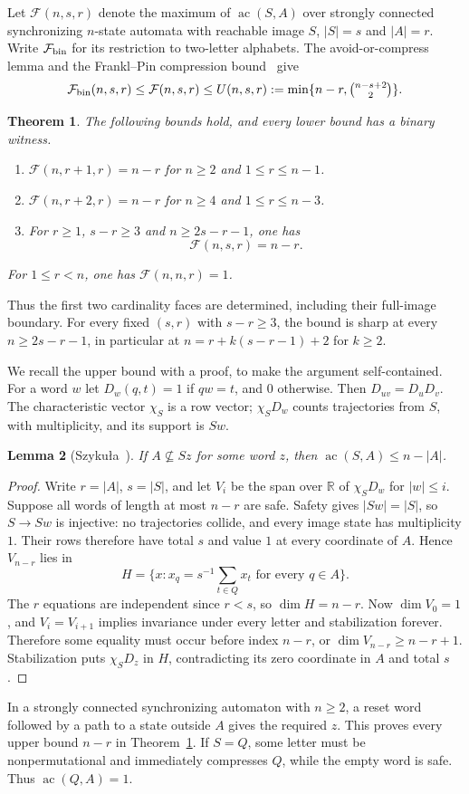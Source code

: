 \documentclass[10pt]{article}
\newtheorem{theorem}{Theorem}
\newtheorem{lemma}[theorem]{Lemma}
\newcommand{\ac}{\operatorname{ac}}
\newcommand{\Max}{\mathcal F}
\begin{document}
Let $\Max(n,s,r)$ denote the maximum of $\ac(S,A)$ over strongly connected synchronizing $n$-state automata with reachable image $S$, $|S|=s$ and $|A|=r$.
Write $\Max_{\rm bin}$ for its restriction to two-letter alphabets. The avoid-or-compress lemma and the Frankl--Pin compression bound~\cite[Theorem~1]{szykula2018} give
\[
 \Max_{\rm bin}(n,s,r)\le\Max(n,s,r)\le
 U(n,s,r):=\min\{n-r,\tbinom{n-s+2}{2}\}.
\]
\begin{theorem}\label{thm:main}
The following bounds hold, and every lower bound has a binary witness.
\begin{enumerate}
\item $\Max(n,r+1,r)=n-r$ for $n\ge2$ and $1\le r\le n-1$.
\item $\Max(n,r+2,r)=n-r$ for $n\ge4$ and $1\le r\le n-3$.
\item For $r\ge1$, $s-r\ge3$ and $n\ge2s-r-1$, one has
\[
 \Max(n,s,r)=n-r.
\]
\end{enumerate}
For $1\le r<n$, one has $\Max(n,n,r)=1$.
\end{theorem}
Thus the first two cardinality faces are determined, including their full-image boundary. For every fixed $(s,r)$ with $s-r\ge3$, the bound is sharp at every $n\ge2s-r-1$, in particular at $n=r+k(s-r-1)+2$ for $k\ge2$.

We recall the upper bound with a proof, to make the argument self-contained. For a word $w$ let $D_w(q,t)=1$ if $qw=t$, and $0$ otherwise. Then $D_{uv}=D_uD_v$. The characteristic vector $\chi_S$ is a row vector; $\chi_SD_w$ counts trajectories from $S$, with multiplicity, and its support is $Sw$.
\begin{lemma}[Szyku\l a~\cite{szykula2018,szykula2026}]\label{lem:upper}
If $A\nsubseteq Sz$ for some word $z$, then $\ac(S,A)\le n-|A|$.
\end{lemma}
\begin{proof}
Write $r=|A|$, $s=|S|$, and let $V_i$ be the span over $\mathbb R$ of $\chi_SD_w$ for $|w|\le i$. Suppose all words of length at most $n-r$ are safe. Safety gives $|Sw|=|S|$, so $S\to Sw$ is injective: no trajectories collide, and every image state has multiplicity $1$. Their rows therefore have total $s$ and value $1$ at every coordinate of $A$. Hence $V_{n-r}$ lies in
\[
 H=\{x:x_q=s^{-1}\textstyle\sum_{t\in Q}x_t\text{ for every }q\in A\}.
\]
The $r$ equations are independent since $r<s$, so $\dim H=n-r$. Now $\dim V_0=1$, and $V_i=V_{i+1}$ implies invariance under every letter and stabilization forever. Therefore some equality must occur before index $n-r$, or $\dim V_{n-r}\ge n-r+1$. Stabilization puts $\chi_SD_z$ in $H$, contradicting its zero coordinate in $A$ and total $s$.
\end{proof}
In a strongly connected synchronizing automaton with $n\ge2$, a reset word followed by a path to a state outside $A$ gives the required $z$. This proves every upper bound $n-r$ in Theorem~\ref{thm:main}. If $S=Q$, some letter must be nonpermutational and immediately compresses $Q$, while the empty word is safe. Thus $\ac(Q,A)=1$.
\end{document}
